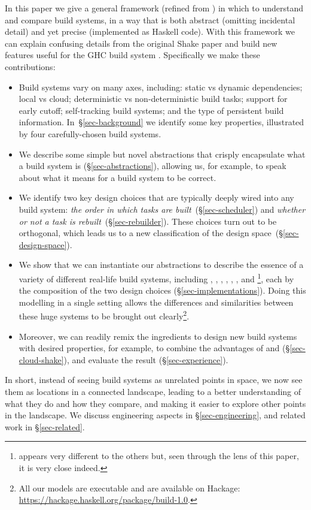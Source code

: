 In this paper we give a general framework (refined from \cite{mokhov2018buildsystems}) in which to understand and compare
build systems, in a way that is both abstract (omitting incidental detail)
and yet precise (implemented as Haskell code). With this framework we can explain confusing details from the original Shake paper \cite{mitchell2012shake} and build new features useful for the GHC build system \cite{hadrian}. Specifically we make these contributions:
\begin{itemize}
\item Build systems vary on many axes, including: static vs dynamic
  dependencies; local vs cloud; deterministic vs non-deterministic build tasks;
  support for early cutoff; self-tracking build systems; and the type of
  persistent build information. In~\S\ref{sec-background} we identify some key
  properties, illustrated by four carefully-chosen build systems.

\item We describe some simple but novel abstractions that
  crisply encapsulate what a build system is (\S\ref{sec-abstractions}),
  allowing us, for example, to speak about what it means for a build system to be correct.

\item We identify two key design choices that are typically deeply wired into
  any build system: \emph{the order in which tasks are
  built}~(\S\ref{sec-scheduler}) and \emph{whether or not a
  task is rebuilt}~(\S\ref{sec-rebuilder}). These choices turn out to
  be orthogonal, which leads us to a new classification of the design
  space~(\S\ref{sec-design-space}).

\item We show that we can instantiate our abstractions to describe the essence
of a variety of different real-life build systems, including \Make, \Shake,
\Bazel, \CloudBuild, \Buck, \Nix, and \Excel\footnote{\Excel appears very
different to the others but, seen through the lens of this paper, it is very
close indeed.}, each by the composition of the two design choices
(\S\ref{sec-implementations}). Doing this modelling in a single setting
allows the differences and similarities between these huge systems to be
brought out clearly\footnote{All our models are executable and are available on
Hackage: \url{https://hackage.haskell.org/package/build-1.0}.}.

\item Moreover, we can readily remix the ingredients to design new build systems
with desired properties, for example, to combine the advantages of \Shake and
\Bazel (\S\ref{sec-cloud-shake}), and evaluate the result (\S\ref{sec-experience}).

\end{itemize}
In short, instead of seeing build systems as unrelated
points in space, we now see them as locations in a connected landscape,
leading to a better understanding of what they do and how they compare,
and making it easier to explore other points in the
landscape.
We discuss engineering aspects in \S\ref{sec-engineering}, and related
work in \S\ref{sec-related}.

